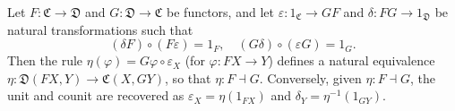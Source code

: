 Let $F: \mathfrak{C} \to \mathfrak{D}$ and $G: \mathfrak{D} \to \mathfrak{C}$ be functors, and let $\varepsilon: 1_{\mathfrak{C}} \to GF$ and $\delta: FG \to 1_{\mathfrak{D}}$ be natural transformations such that
$$(\delta F) \circ (F\varepsilon) = 1_F, \quad (G\delta) \circ (\varepsilon G) = 1_G.$$
Then the rule $\eta(\varphi) = G\varphi \circ \varepsilon_X$ (for $\varphi: FX \to Y$) defines a natural equivalence $\eta: \mathfrak{D}(FX, Y) \to \mathfrak{C}(X, GY)$, so that $\eta: F \dashv G$. Conversely, given $\eta: F \dashv G$, the unit and counit are recovered as $\varepsilon_X = \eta(1_{FX})$ and $\delta_Y = \eta^{-1}(1_{GY})$.
